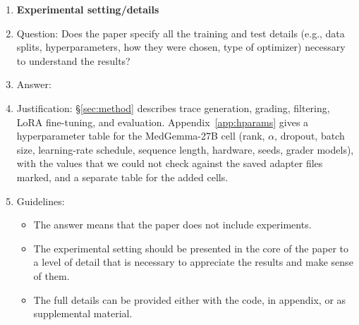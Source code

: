 \begin{enumerate}
\begin{itemize}
        \item The authors should provide instructions on data access and preparation, including how to access the raw data, preprocessed data, intermediate data, and generated data, etc.
        \item The authors should provide scripts to reproduce all experimental results for the new proposed method and baselines. If only a subset of experiments are reproducible, they should state which ones are omitted from the script and why.
        \item At submission time, to preserve anonymity, the authors should release anonymized versions (if applicable).
        \item Providing as much information as possible in supplemental material (appended to the paper) is recommended, but including URLs to data and code is permitted.
    \end{itemize}

\item {\bf Experimental setting/details}
    \item[] Question: Does the paper specify all the training and test details (e.g., data splits, hyperparameters, how they were chosen, type of optimizer) necessary to understand the results?
    \item[] Answer: \answerYes{}
    \item[] Justification: \S\ref{sec:method} describes trace generation, grading, filtering, LoRA fine-tuning, and evaluation. Appendix~\ref{app:hparams} gives a hyperparameter table for the MedGemma-27B cell (rank, $\alpha$, dropout, batch size, learning-rate schedule, sequence length, hardware, seeds, grader models), with the values that we could not check against the saved adapter files marked, and a separate table for the added cells.
    \item[] Guidelines:
    \begin{itemize}
        \item The answer \answerNA{} means that the paper does not include experiments.
        \item The experimental setting should be presented in the core of the paper to a level of detail that is necessary to appreciate the results and make sense of them.
        \item The full details can be provided either with the code, in appendix, or as supplemental material.
    \end{itemize}


\end{enumerate}
